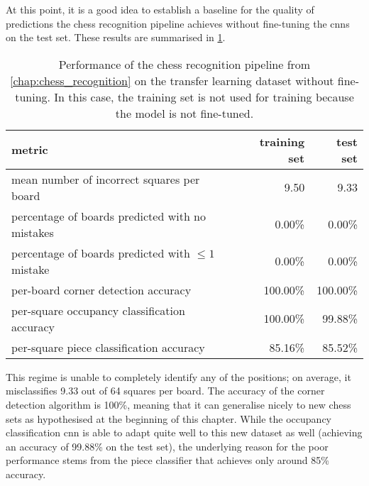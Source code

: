 \documentclass[../report.tex]{subfiles}
\begin{document}
At this point, it is a good idea to establish a baseline for the quality of predictions the chess recognition pipeline achieves without fine-tuning the \glspl{cnn} on the test set.
These results are summarised in \cref{tbl:transfer_learning_results_without_finetuning}.
\begin{table}
    \centering
    \begin{tabular}{lrr}
        \toprule
        metric & training set & test set \\
        \midrule
        mean number of incorrect squares per board           & 9.50     & 9.33 \\
        percentage of boards predicted with no mistakes      & 0.00\%   & 0.00\%   \\
        percentage of boards predicted with $\leq 1$ mistake & 0.00\%   & 0.00\%   \\
        per-board corner detection accuracy                  & 100.00\% & 100.00\% \\
        per-square occupancy classification accuracy         & 100.00\% & 99.88\% \\
        per-square piece classification accuracy             & 85.16\%  & 85.52\% \\
        \bottomrule
    \end{tabular}
    \caption[Performance of the chess recognition pipeline from \cref{chap:chess_recognition} on the transfer learning dataset without fine-tuning.]{Performance of the chess recognition pipeline from \cref{chap:chess_recognition} on the transfer learning dataset without fine-tuning. In this case, the training set is not used for training because the model is not fine-tuned.}
    \label{tbl:transfer_learning_results_without_finetuning}
\end{table}
This regime is unable to completely identify any of the positions; on average, it misclassifies 9.33 out of 64 squares per board.
The accuracy of the corner detection algorithm is 100\%, meaning that it can generalise nicely to new chess sets as hypothesised at the beginning of this chapter.
While the occupancy classification \gls{cnn} is able to adapt quite well to this new dataset as well (achieving an accuracy of 99.88\% on the test set), the underlying reason for the poor performance stems from the piece classifier that achieves only around 85\% accuracy.
\end{document}
